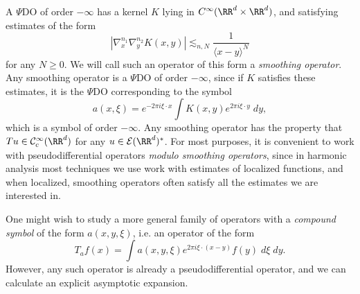 A $\Psi$DO of order $-\infty$ has a kernel $K$ lying in $C^\infty(\RR^d \times \RR^d)$, and satisfying estimates of the form
%
\[ | \nabla^{n_1}_x \nabla^{n_2}_y K(x,y)| \lesssim_{n,N} \frac{1}{\langle x - y \rangle^N} \]
%
for any $N \geq 0$. We will call such an operator of this form a \emph{smoothing operator}. Any smoothing operator is a $\Psi$DO of order $-\infty$, since if $K$ satisfies these estimates, it is the $\Psi$DO corresponding to the symbol
%
\[ a(x,\xi) = e^{- 2 \pi i \xi \cdot x} \int K(x,y) e^{2 \pi i \xi \cdot y}\; dy, \]
%
which is a symbol of order $-\infty$. Any smoothing operator has the property that $Tu \in \mathcal{C}_c^\infty(\RR^d)$ for any $u \in \mathcal{E}(\RR^d)^*$. For most purposes, it is convenient to work with pseudodifferential operators \emph{modulo smoothing operators}, since in harmonic analysis most techniques we use work with estimates of localized functions, and when localized, smoothing operators often satisfy all the estimates we are interested in.

One might wish to study a more general family of operators with a \emph{compound symbol} of the form $a(x,y,\xi)$, i.e. an operator of the form
%
\[ T_a f(x) = \int a(x,y,\xi) e^{2 \pi i \xi \cdot (x - y)} f(y)\; d\xi\; dy. \]
%
However, any such operator is already a pseudodifferential operator, and we can calculate an explicit asymptotic expansion.

